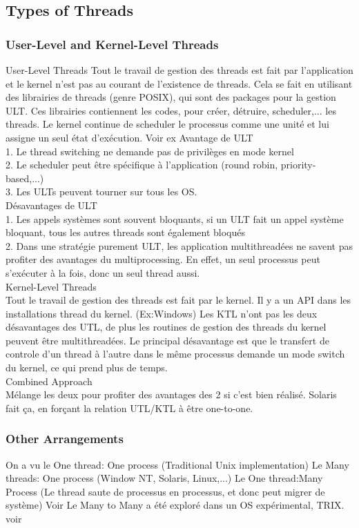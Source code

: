 \subsection{Types of Threads}
\subsubsection{User-Level and Kernel-Level Threads}
User-Level Threads
Tout le travail de gestion des threads est fait par l'application et le kernel n'est pas au courant de l'existence de threads. Cela se fait en utilisant des librairies de threads (genre POSIX), qui sont des packages pour la gestion ULT. Ces librairies contiennent les codes, pour créer, détruire, scheduler,... les threads. Le kernel continue de scheduler le processus comme une unité et lui assigne un seul état d'exécution. Voir ex \cite[p.~186]{stallings} Avantage de ULT \\
1. Le thread switching ne demande pas de privilèges en mode kernel \\
2. Le scheduler peut être spécifique à l'application (round robin, priority-based,...) \\
3. Les ULTs peuvent tourner sur tous les OS. \\
Désavantages de ULT \\
1. Les appels systèmes sont souvent bloquants, si un ULT fait un appel système bloquant, tous les autres threads sont également bloqués \\
2. Dans une stratégie purement ULT, les application multithreadées ne savent pas profiter des avantages du multiprocessing. En effet, un seul processus peut s'exécuter à la fois, donc un seul thread aussi. \\
Kernel-Level Threads \\
Tout le travail de gestion des threads est fait par le kernel. Il y a un API dans les installations thread du kernel. (Ex:Windows)
Les KTL n'ont pas les deux désavantages des UTL, de plus les routines de gestion des threads du kernel peuvent être multithreadées. Le principal désavantage est que le transfert de controle d'un thread à l'autre dans le même processus demande un mode switch du kernel, ce qui prend plus de temps.\\
Combined Approach \\
Mélange les deux pour profiter des avantages des 2 si c'est bien réalisé. Solaris fait ça, en forçant la relation UTL/KTL à être one-to-one.
\subsubsection{Other Arrangements}
On a vu le One thread: One process (Traditional Unix implementation)
Le Many threads: One process (Window NT, Solaris, Linux,...)
Le One thread:Many Process (Le thread saute de processus en processus, et donc peut migrer de système) Voir \cite[p.~189]{stallings} Le Many to Many a été exploré dans un OS expérimental, TRIX. voir \cite[p.~188]{stallings}
